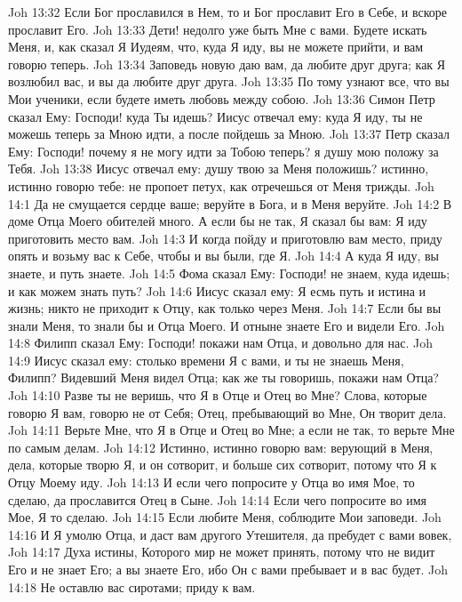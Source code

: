 \vs Joh 13:32 Если Бог прославился в Нем, то и Бог прославит Его в Себе, и вскоре прославит Его.
\vs Joh 13:33 Дети! недолго уже быть Мне с вами. Будете искать Меня, и, как сказал Я Иудеям, что, куда Я иду, вы не можете прийти,  и вам говорю теперь.
\vs Joh 13:34 Заповедь новую даю вам, да любите друг друга; как Я возлюбил вас,  и вы да любите друг друга.
\vs Joh 13:35 По тому узнают все, что вы Мои ученики, если будете иметь любовь между собою.
\vs Joh 13:36 Симон Петр сказал Ему: Господи! куда Ты идешь? Иисус отвечал ему: куда Я иду, ты не можешь теперь за Мною идти, а после пойдешь за Мною.
\vs Joh 13:37 Петр сказал Ему: Господи! почему я не могу идти за Тобою теперь? я душу мою положу за Тебя.
\vs Joh 13:38 Иисус отвечал ему: душу твою за Меня положишь? истинно, истинно говорю тебе: не пропоет петух, как отречешься от Меня трижды.
\vs Joh 14:1 Да не смущается сердце ваше; веруйте в Бога, и в Меня веруйте.
\vs Joh 14:2 В доме Отца Моего обителей много. А если бы не так, Я сказал бы вам: Я иду приготовить место вам.
\vs Joh 14:3 И когда пойду и приготовлю вам место, приду опять и возьму вас к Себе, чтобы и вы были, где Я.
\vs Joh 14:4 А куда Я иду, вы знаете, и путь знаете.
\vs Joh 14:5 Фома сказал Ему: Господи! не знаем, куда идешь; и как можем знать путь?
\vs Joh 14:6 Иисус сказал ему: Я есмь путь и истина и жизнь; никто не приходит к Отцу, как только через Меня.
\vs Joh 14:7 Если бы вы знали Меня, то знали бы и Отца Моего. И отныне знаете Его и видели Его.
\vs Joh 14:8 Филипп сказал Ему: Господи! покажи нам Отца, и довольно для нас.
\vs Joh 14:9 Иисус сказал ему: столько времени Я с вами, и ты не знаешь Меня, Филипп? Видевший Меня видел Отца; как же ты говоришь, покажи нам Отца?
\vs Joh 14:10 Разве ты не веришь, что Я в Отце и Отец во Мне? Слова, которые говорю Я вам, говорю не от Себя; Отец, пребывающий во Мне, Он творит дела.
\vs Joh 14:11 Верьте Мне, что Я в Отце и Отец во Мне; а если не так, то верьте Мне по самым делам.
\vs Joh 14:12 Истинно, истинно говорю вам: верующий в Меня, дела, которые творю Я, и он сотворит, и больше сих сотворит, потому что Я к Отцу Моему иду.
\vs Joh 14:13 И если чего попросите у Отца во имя Мое, то сделаю, да прославится Отец в Сыне.
\vs Joh 14:14 Если чего попросите во имя Мое, Я то сделаю.
\vs Joh 14:15 Если любите Меня, соблюдите Мои заповеди.
\vs Joh 14:16 И Я умолю Отца, и даст вам другого Утешителя, да пребудет с вами вовек,
\vs Joh 14:17 Духа истины, Которого мир не может принять, потому что не видит Его и не знает Его; а вы знаете Его, ибо Он с вами пребывает и в вас будет.
\vs Joh 14:18 Не оставлю вас сиротами; приду к вам.
